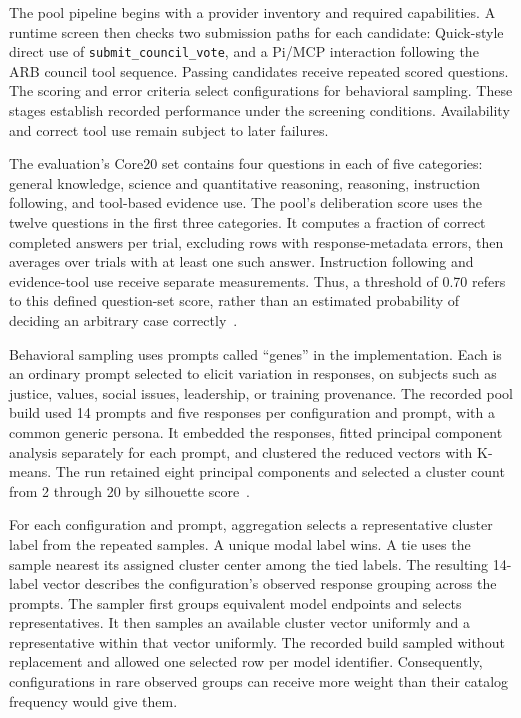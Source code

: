 \documentclass[11pt]{article}
\newcommand{\code}[1]{\texttt{#1}}
\begin{document}
The pool pipeline begins with a provider inventory and required capabilities.  A runtime screen then checks two submission paths for each candidate: Quick-style direct use of \code{submit\_council\_vote}, and a Pi/MCP interaction following the ARB council tool sequence.  Passing candidates receive repeated scored questions.  The scoring and error criteria select configurations for behavioral sampling.  These stages establish recorded performance under the screening conditions.  Availability and correct tool use remain subject to later failures.

The evaluation's Core20 set contains four questions in each of five categories: general knowledge, science and quantitative reasoning, reasoning, instruction following, and tool-based evidence use.  The pool's deliberation score uses the twelve questions in the first three categories.  It computes a fraction of correct completed answers per trial, excluding rows with response-metadata errors, then averages over trials with at least one such answer.  Instruction following and evidence-tool use receive separate measurements.  Thus, a threshold of 0.70 refers to this defined question-set score, rather than an estimated probability of deciding an arbitrary case correctly~\cite{poolpaper}.

Behavioral sampling uses prompts called ``genes'' in the implementation.  Each is an ordinary prompt selected to elicit variation in responses, on subjects such as justice, values, social issues, leadership, or training provenance.  The recorded pool build used 14 prompts and five responses per configuration and prompt, with a common generic persona.  It embedded the responses, fitted principal component analysis separately for each prompt, and clustered the reduced vectors with K-means.  The run retained eight principal components and selected a cluster count from 2 through 20 by silhouette score~\cite{poolpaper}.

For each configuration and prompt, aggregation selects a representative cluster label from the repeated samples.  A unique modal label wins.  A tie uses the sample nearest its assigned cluster center among the tied labels.  The resulting 14-label vector describes the configuration's observed response grouping across the prompts.  The sampler first groups equivalent model endpoints and selects representatives.  It then samples an available cluster vector uniformly and a representative within that vector uniformly.  The recorded build sampled without replacement and allowed one selected row per model identifier.  Consequently, configurations in rare observed groups can receive more weight than their catalog frequency would give them.
\end{document}
